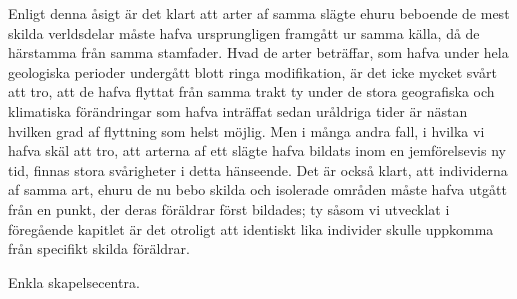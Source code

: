 Enligt denna åsigt är det klart att arter af samma slägte ehuru beboende de mest skilda verldsdelar måste hafva ursprungligen framgått ur samma källa, då de härstamma från samma stamfader. Hvad de arter beträffar, som hafva under hela geologiska perioder undergått blott ringa modifikation, är det icke mycket svårt att tro, att de hafva flyttat från samma trakt ty under de stora geografiska och klimatiska förändringar som hafva inträffat sedan uråldriga tider är nästan hvilken grad af flyttning som helst möjlig. Men i många andra fall, i hvilka vi hafva skäl att tro, att arterna af ett slägte hafva bildats inom en jemförelsevis ny tid, finnas stora svårigheter i detta hänseende. Det är också klart, att individerna af samma art, ehuru de nu bebo skilda och isolerade områden måste hafva utgått från en punkt, der deras föräldrar först bildades; ty såsom vi utvecklat i föregående kapitlet är det otroligt att identiskt lika individer skulle uppkomma från specifikt skilda föräldrar.



Enkla skapelsecentra.

